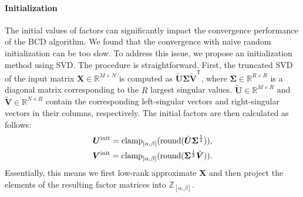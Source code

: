 

\paragraph*{Initialization}
The initial values of factors can significantly impact the convergence performance of the BCD algorithm. We found that the convergence with naive random initialization can be too slow. To address this issue, we propose an initialization method using SVD. The procedure is straightforward. First, the truncated SVD of the input matrix $\bm{X} \in \mathbb{R}^{M \times N}$ is computed as $\tilde{\bm{U}} \bm{\Sigma} \tilde{\bm{V}}^\mathsf{T}$, where $\bm{\Sigma} \in \mathbb{R}^{R \times R}$ is a diagonal matrix corresponding to the $R$ largest singular values. $\tilde{\bm{U}} \in \mathbb{R}^{M \times R}$ and $\tilde{\bm{V}} \in \mathbb{R}^{N \times R}$ contain the corresponding left-singular vectors and right-singular vectors in their columns, respectively. The initial factors are then calculated as follows:
\begin{align}
    \bm{U}^{\rm init} = \operatorname{clamp}_{[\alpha,\beta]}(\operatorname{round}(\tilde{\bm{U}} \bm{\Sigma}^\frac{1}{2})), \label{eq:initialization_u} \\
    \bm{V}^{\rm init} = \operatorname{clamp}_{[\alpha,\beta]}(\operatorname{round}(\bm{\Sigma}^\frac{1}{2} \tilde{\bm{V}})). \label{eq:initialization_v}
\end{align}
Essentially, this means we first low-rank approximate $\bm{X}$ and then project the elements of the resulting factor matrices into $\mathbb{Z}_{[\alpha,\beta]}$.

